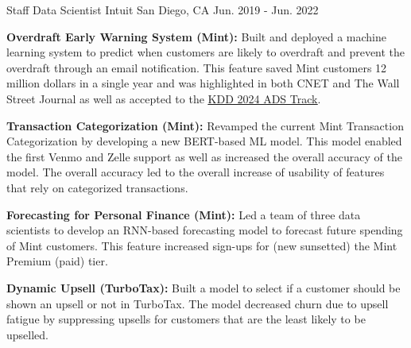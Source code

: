 \begin{cventries}
\cventry
    {Staff Data Scientist} %
    {Intuit} %
    {San Diego, CA} %
    {Jun. 2019 - Jun. 2022} %
    {\begin{cvitems}
        \setlength\itemsep{.15em}
        \item { \textbf{Overdraft Early Warning System (Mint): }Built and deployed a machine learning system to predict when customers are likely to overdraft and prevent the overdraft through an email notification. This feature saved Mint customers 12 million dollars in a single year and was highlighted in both CNET and The Wall Street Journal as well as accepted to the \href{https://dl.acm.org/doi/10.1145/3637528.3671628}{\underline{KDD 2024 ADS Track}}. }
        \item { \textbf{Transaction Categorization (Mint): }  Revamped the current Mint Transaction Categorization by developing a new BERT-based ML model. This model enabled the first Venmo and Zelle support as well as increased the overall accuracy of the model. The overall accuracy led to the overall increase of usability of features that rely on categorized transactions. }
         \item { \textbf{Forecasting for Personal Finance (Mint): } Led a team of three data scientists to develop an RNN-based forecasting model to forecast future spending of Mint customers. This feature increased sign-ups for (new sunsetted) the Mint Premium (paid) tier.}
         \item { \textbf{Dynamic Upsell (TurboTax):} Built a model to select if a customer should be shown an upsell or not in TurboTax. The model decreased churn due to upsell fatigue by suppressing upsells for customers that are the least likely to be upselled. }
     \end{cvitems}}



\end{cventries}
